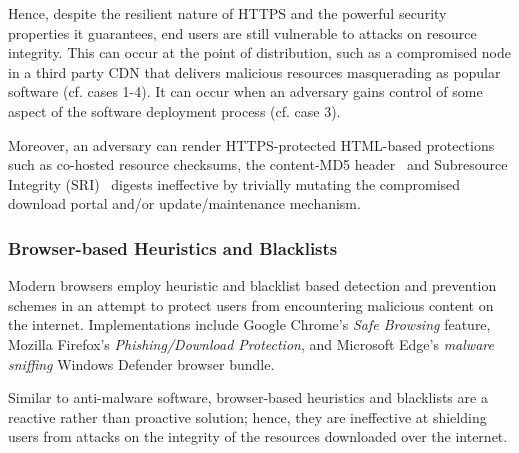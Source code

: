 Hence, despite the resilient nature of HTTPS and the powerful security
properties it guarantees, end users are still vulnerable to attacks on resource
integrity. This can occur at the point of distribution, such as a compromised
node in a third party CDN that delivers malicious resources masquerading as
popular software (cf. cases 1-4). It can occur when an adversary gains
control of some aspect of the software deployment process (cf. case 3).

Moreover, an adversary can render HTTPS-protected HTML-based protections such as
co-hosted resource checksums, the content-MD5 header~\cite{MD5Header} and
Subresource Integrity (SRI)~\cite{SRI} digests ineffective by trivially mutating
the compromised download portal and/or update/maintenance mechanism.

\subsubsection{Browser-based Heuristics and Blacklists}

Modern browsers employ heuristic and blacklist based detection and prevention
schemes in an attempt to protect users from encountering malicious content on
the internet. Implementations include Google Chrome's \textit{Safe Browsing}
feature, Mozilla Firefox's \textit{Phishing/Download Protection}, and Microsoft
Edge's \textit{malware sniffing} Windows Defender browser bundle.

Similar to anti-malware software, browser-based heuristics and blacklists are a
reactive rather than proactive solution; hence, they are ineffective at
shielding users from attacks on the integrity of the resources downloaded over
the internet.
